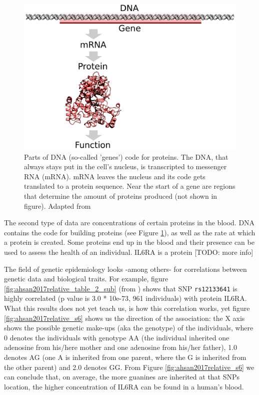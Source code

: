 \begin{figure}[!htbp]
  \centering
  \includegraphics[width=\linewidth]{DNA_to_protein.png}
  \caption{
    Parts of DNA (so-called 'genes') code for proteins. 
    The DNA, that always stays put in the cell's nucleus, 
    is transcripted to messenger RNA (mRNA).
    mRNA leaves the nucleus and its code gets translated to 
    a protein sequence.
    Near the start of a gene are regions that determine the amount
    of proteins produced (not shown in figure).
    Adapted from \cite{shafee2015}
  }
  \label{fig:dna_to_protein}
\end{figure}

The second type of data are concentrations of certain proteins in the 
blood. DNA contains the code for building proteins (see Figure 
\ref{fig:dna_to_protein}), 
as well as the rate
at which a protein is created. Some proteins end up in the blood and
their presence can be used to assess the health of an individual.
IL6RA is a protein [TODO: more info]

The field of genetic epidemiology looks -among others- for
correlations between genetic data and biological traits.
For example, figure \ref{fig:ahsan2017relative_table_2_sub} (from \cite{ahsan2017relative}) shows that
SNP \verb|rs12133641| is highly correlated (p value is 3.0 * 10e-73, 
961 individuals) with protein IL6RA. What this results does
not yet teach us, is how this correlation works, yet
figure \ref{fig:ahsan2017relative_s6} shows us the direction of the association:
the X axis shows the possible genetic make-ups (aka the genotype) of the individuals,
where 0 denotes the individuals with genotype
AA (the individual inherited one adenosine 
from his/here mother and one adenosine from his/her father), 
1.0 denotes AG (one A is inherited from one parent, 
where the G is inherited from the other parent) and 2.0 denotes GG.
From Figure \ref{fig:ahsan2017relative_s6} we can conclude that, on average,
the more guanines are inherited at that SNPs location,
the higher concentration of IL6RA can be found in a human's blood.

